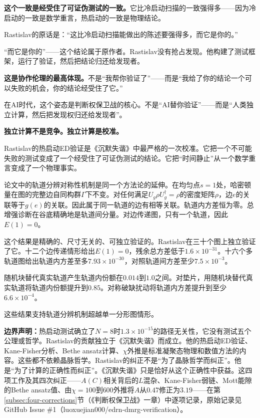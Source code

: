 \documentclass[11pt,a4paper]{book}
\theoremstyle{definition}
\begin{document}
\textbf{这个一致是经受住了可证伪测试的一致。}它比冷启动扫描的一致强得多——因为冷启动的一致是数学重言，热启动的一致是物理结论。

Rastislav的原话是：“这比冷启动扫描能做出的陈述要强得多，而它是你的。”

“而它是你的”——这个结论属于原作者。Rastislav没有抢占发现。他构建了测试框架，运行了验证，然后把结论归还给发现者。

\textbf{这是协作伦理的最高体现。}不是“我帮你验证了”——而是“我给了你的结论一个可以失败的机会，你的结论经受住了它。”

在AI时代，这个姿态是判断权保卫战的核心。不是“AI替你验证”——而是“人类独立计算，然后把发现权归还给发现者”。

\textbf{独立计算不是竞争。独立计算是校准。}

Rastislav的热启动ED验证是《沉默失谐》中最严格的一次校准。它把一个不可能失败的测试变成了一个经受住了可证伪测试的结论。它把“时间静止”从一个数学重言变成了一个物理事实。

论文中的轨道分辨对称性机制是同一个方法论的延伸。在均匀点$s=1$处，哈密顿量在图的完整边自同构群$\Gamma$下不变。对任何满足$U_g \rho U_g^\dagger = \rho$的密度矩阵$\rho$，边$e$的关联等于$g(e)$的关联。因此属于同一轨道的边有相等关联。轨道内方差恒为零。总增强诊断在谷底精确地是轨道间分量。对边传递图，只有一个轨道，因此$E(1)=0$。

这个结果是精确的、尺寸无关的、可独立验证的。Rastislav在三十个图上独立验证了它。十二个边传递情形给出$E(1)=0$，残余总方差低于$1.6\times10^{-31}$。十六个多轨道图给出轨道内方差至多$7.93\times10^{-30}$，对照轨道间方差至少$7.5\times10^{-3}$。

随机块替代真实轨道产生轨道内份额在$0.014$到$1.0$之间。对垫片，用随机块替代真实轨道将轨道内份额提升到$0.85$。对称破缺扰动将轨道内方差提升到至少$6.6\times10^{-4}$。

这些结果支持轨道分辨机制超越单一分形图情形。

\textbf{边界声明：}热启动测试确立了$N=8$时$1.3\times10^{-15}$的路径无关性，它没有测试五个公理或哲学。Rastislav的贡献独立于《沉默失谐》而成立。他的热启动ED验证、Kane-Fisher分析、Bethe ansatz计算、$\chi$外推是标准凝聚态物理和数值方法的内容。这些都不依赖晶脉哲学。Rastislav的纠正不是“为了晶脉哲学而纠正”。他是“为了计算的正确性而纠正”。《沉默失谐》只是恰好从这个正确性中获益。这四项工作及其四次纠正——$A(C)$相关背后的$L$混杂、Kane-Fisher弱链、Mott能隙的Bethe ansatz值、由$\chi=100$到$600$外推将$A$从$0.47$修正为$3.19$——在第\ref{subsec:four-corrections}节（《判断权保卫战》一章）中逐项记录，原始记录见GitHub Issue \#1（luoxuejian000/edrn-dmrg-verification）。
\end{document}
